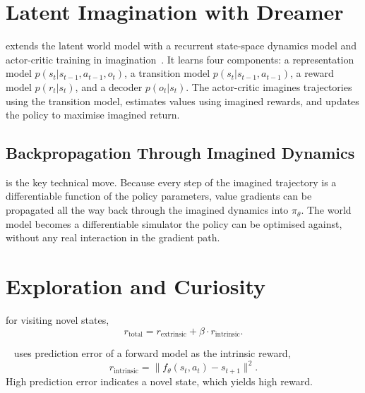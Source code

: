 \section{Latent Imagination with Dreamer}


 extends the latent world model with a recurrent state-space dynamics model and actor-critic training in imagination~\cite{Hafner2020Dreamer}. It learns four components: a representation model $p(s_t | s_{t-1}, a_{t-1}, o_t)$, a transition model $p(s_t | s_{t-1}, a_{t-1})$, a reward model $p(r_t | s_t)$, and a decoder $p(o_t | s_t)$. The actor-critic imagines trajectories using the transition model, estimates values using imagined rewards, and updates the policy to maximise imagined return.

\subsection{Backpropagation Through Imagined Dynamics}

 is the key technical move. Because every step of the imagined trajectory is a differentiable function of the policy parameters, value gradients can be propagated all the way back through the imagined dynamics into $\pi_\theta$. The world model becomes a differentiable simulator the policy can be optimised against, without any real interaction in the gradient path.


\section{Exploration and Curiosity}


 for visiting novel states,
\begin{equation}
    r_{\text{total}} = r_{\text{extrinsic}} + \beta \cdot r_{\text{intrinsic}}.
\end{equation}

~\cite{Pathak2017Curiosity} uses prediction error of a forward model as the intrinsic reward,
\begin{equation}
    r_{\text{intrinsic}} = \|f_\theta(s_t, a_t) - s_{t+1}\|^2.
\end{equation}
High prediction error indicates a novel state, which yields high reward.

